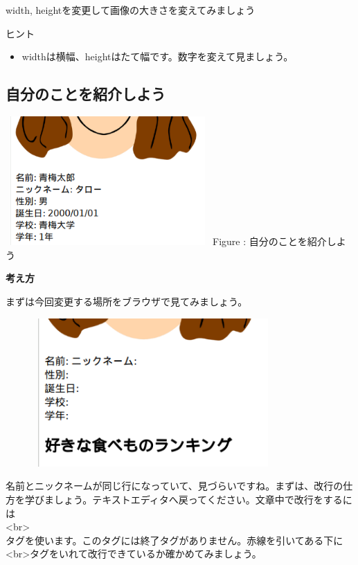 \documentclass[a4paper,12pt]{jarticle}
\begin{document}
width,
heightを変更して画像の大きさを変えてみましょう

ヒント

\begin{itemize}
  \item
        widthは横幅、heightはたて幅です。数字を変えて見ましょう。
\end{itemize}


\clearpage
{}
\subsection{\theExercise 自分のことを紹介しよう}
\centering
\begin{minipage}{7.788cm}
  \includegraphics[width=7.788cm,height=4.927cm]{textbook-img173.png}
  \newline
  Figure : 自分のことを紹介しよう
\end{minipage}

\bigskip

\flushleft

\textbf{考え方}


\bigskip

まずは今回変更する場所をブラウザで見てみましょう。

\centering
\includegraphics[width=11.28cm,height=5.667cm]{textbook-img175.png}

\bigskip

\flushleft
名前とニックネームが同じ行になっていて、見づらいですね。まずは、改行の仕方を学びましょう。テキストエディタへ戻ってください。文章中で改行をするには\\
{\textless}br{\textgreater} \ \ \ \ \ \\
タグを使います。このタグには終了タグがありません。赤線を引いてある下に{\textless}br{\textgreater}タグをいれて改行できているか確かめてみましょう。
\end{document}
